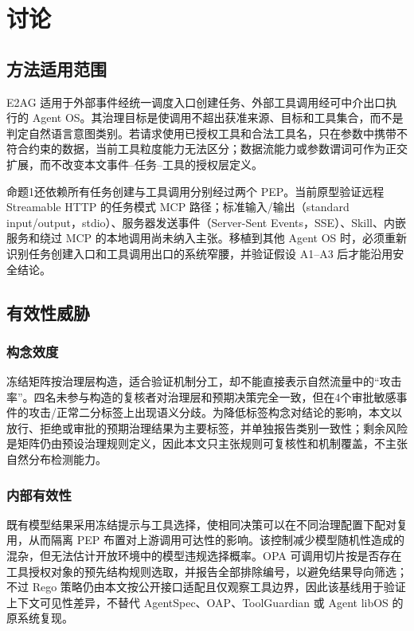 \section{讨论}\label{sec:discussion-v11}

\subsection{方法适用范围}

E2AG 适用于外部事件经统一调度入口创建任务、外部工具调用经可中介出口执行的 Agent OS。其治理目标是使调用不超出获准来源、目标和工具集合，而不是判定自然语言意图类别。若请求使用已授权工具和合法工具名，只在参数中携带不符合约束的数据，当前工具粒度能力无法区分；数据流能力或参数谓词可作为正交扩展，而不改变本文事件--任务--工具的授权层定义。

命题1还依赖所有任务创建与工具调用分别经过两个 PEP。当前原型验证远程 Streamable HTTP 的任务模式 MCP 路径；标准输入/输出（standard input/output，stdio）、服务器发送事件（Server-Sent Events，SSE）、Skill、内嵌服务和绕过 MCP 的本地调用尚未纳入主张。移植到其他 Agent OS 时，必须重新识别任务创建入口和工具调用出口的系统窄腰，并验证假设 A1--A3 后才能沿用安全结论。

\subsection{有效性威胁}

\subsubsection{构念效度}

冻结矩阵按治理层构造，适合验证机制分工，却不能直接表示自然流量中的“攻击率”。四名未参与构造的复核者对治理层和预期决策完全一致，但在4个审批敏感事件的攻击/正常二分标签上出现语义分歧。为降低标签构念对结论的影响，本文以放行、拒绝或审批的预期治理结果为主要标签，并单独报告类别一致性；剩余风险是矩阵仍由预设治理规则定义，因此本文只主张规则可复核性和机制覆盖，不主张自然分布检测能力。

\subsubsection{内部有效性}

既有模型结果采用冻结提示与工具选择，使相同决策可以在不同治理配置下配对复用，从而隔离 PEP 布置对上游调用可达性的影响。该控制减少模型随机性造成的混杂，但无法估计开放环境中的模型违规选择概率。OPA 可调用切片按是否存在工具授权对象的预先结构规则选取，并报告全部排除编号，以避免结果导向筛选；不过 Rego 策略仍由本文按公开接口适配且仅观察工具边界，因此该基线用于验证上下文可见性差异，不替代 AgentSpec、OAP、ToolGuardian 或 Agent libOS 的原系统复现。


